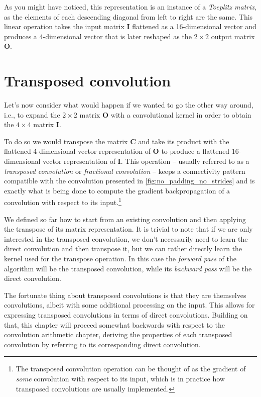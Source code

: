 \documentclass[notitlepage]{report}
\begin{document}
As you might have noticed, this representation is an instance of a
\emph{Toeplitz matrix}, as the elements of each descending diagonal from left
to right are the same.  This linear operation takes the input matrix
$\mathbf{I}$ flattened as a 16-dimensional vector and produces a 4-dimensional
vector that is later reshaped as the $2 \times 2$ output matrix $\mathbf{O}$.

\section{Transposed convolution}

Let's now consider what would happen if we wanted to go the other way around,
i.e., to expand the $2 \times 2$ matrix $\mathbf{O}$ with a convolutional
kernel in order to obtain the $4 \times 4$ matrix $\mathbf{I}$.

To do so we would transpose the matrix $\mathbf{C}$ and take its product with
the flattened 4-dimensional vector representation of $\mathbf{O}$ to produce a
flattened 16-dimensional vector representation of $\mathbf{I}$. This operation
-- usually referred to as a {\em transposed convolution\/} or {\em fractional
convolution\/} -- keeps a connectivity pattern compatible with the convolution
presented in \autoref{fig:no_padding_no_strides} and is exactly what is being
done to compute the gradient backpropagation of a convolution with respect to
its input.\footnote{The transposed convolution operation can be thought of as
    the gradient of {\em some\/} convolution with respect to its input, which
    is in practice how transposed convolutions are usually implemented.}

We defined so far how to start from an existing convolution and then applying
the transpose of its matrix representation. It is trivial to note that if we
are only interested in the transposed convolution, we don't necessarily need to
learn the direct convolution and then transpose it, but we can rather directly
learn the kernel used for the transpose operation. In this case the
{\em forward pass\/} of the algorithm will be the transposed convolution, while
its {\em backward pass\/} will be the direct convolution.

The fortunate thing about transposed convolutions is that they are themselves
convolutions, albeit with some additional processing on the input. This allows
for expressing transposed convolutions in terms of direct convolutions.
Building on that, this chapter will proceed somewhat backwards with respect to
the convolution arithmetic chapter, deriving the properties of each transposed
convolution by referring to its corresponding direct convolution.
\end{document}
